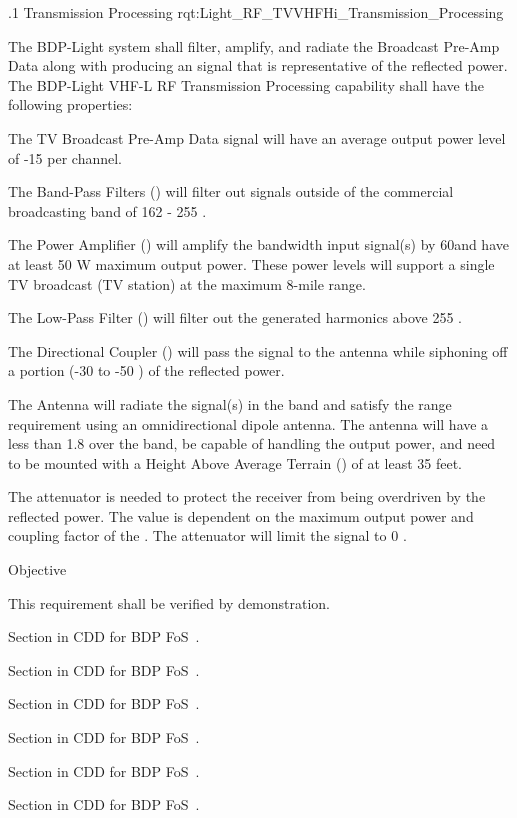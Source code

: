 
\ONERQMTV
{\RqtNumberBase.1}
{\ThisSubSegment Transmission Processing}
{rqt:Light_RF_TVVHFHi_Transmission_Processing}
{
The BDP-Light system shall filter, amplify, and radiate the \TVVHFHigh \RF Broadcast Pre-Amp Data along with producing an \RF signal that is representative of the reflected \RF power. The BDP-Light VHF-L RF Transmission Processing capability shall have the following properties:
\begin{my_enumerate}
	\item The TV \RF Broadcast Pre-Amp Data signal will have an average output power level of -15 \dBm per \RF channel.
	\item The Band-Pass Filters (\BPF) will filter out signals outside of the commercial \FM broadcasting band of 162 - 255 \MHz.
	\item The \RF Power Amplifier (\PA) will amplify the \TVVHFHigh bandwidth input signal(s) by 60\dB and have at least 50 W maximum output power. These power levels will support a single TV broadcast (TV station) at the maximum 8-mile range.
	\item The Low-Pass Filter (\LPF) will filter out the generated harmonics above 255 \MHz.
	\item The Directional Coupler (\DC) will pass the \RF signal to the antenna while siphoning off a portion (-30 to -50 \dB) of the reflected power.
	\item The Antenna will radiate the \RF signal(s) in the \TVVHFHigh band and satisfy the range requirement using an omnidirectional dipole antenna. The antenna will have a \VSWR less than 1.8 over the \TVVHFHigh band, be capable of handling the \PA output power, and need to be mounted with a Height Above Average Terrain (\HAAT) of at least 35 feet.
	\item The attenuator is needed to protect the receiver from being overdriven by the reflected power. The value is dependent on the maximum \PA output power and coupling factor of the \DC. The attenuator will limit the signal to 0 \dBm.
\end{my_enumerate}
}
{
	\item [Phase 1]  Objective
}
{This requirement shall be verified by demonstration.}
{
	\item [5.1.1] Section in CDD for BDP FoS~\cite{ref__BDP_FOS_CDD}.
	\item [5.1.2] Section in CDD for BDP FoS~\cite{ref__BDP_FOS_CDD}.
	\item [5.1.4] Section in CDD for BDP FoS~\cite{ref__BDP_FOS_CDD}.
	\item [5.5.1] Section in CDD for BDP FoS~\cite{ref__BDP_FOS_CDD}.
	\item [5.5.3] Section in CDD for BDP FoS~\cite{ref__BDP_FOS_CDD}.
	\item [5.5.4] Section in CDD for BDP FoS~\cite{ref__BDP_FOS_CDD}.
}
